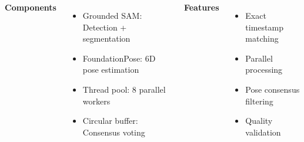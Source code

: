 \documentclass[serif, aspectratio=169, 9pt]{beamer}
\begin{document}
\begin{frame}
    \vspace{0.4em}
    \begin{columns}
        \textbf{Components}
        \begin{itemize}
            \item Grounded SAM: Detection + segmentation
            \item FoundationPose: 6D pose estimation
            \item Thread pool: 8 parallel workers
            \item Circular buffer: Consensus voting
        \end{itemize}
        \textbf{Features}
        \begin{itemize}
            \item Exact timestamp matching
            \item Parallel processing
            \item Pose consensus filtering
            \item Quality validation
        \end{itemize}
    \end{columns}
\end{frame}
\end{document}
